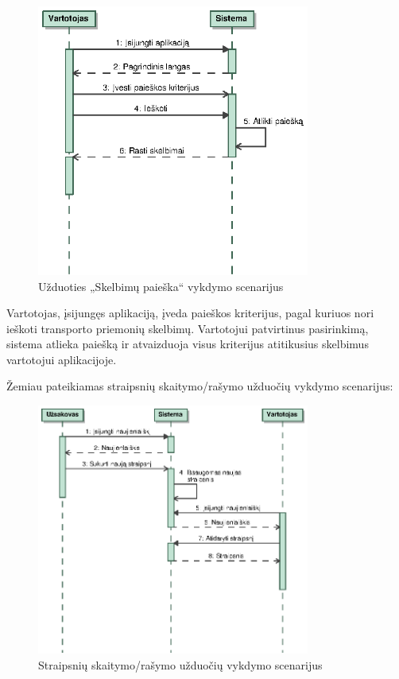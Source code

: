 \documentclass[12pt]{article}
\begin{document}
	\begin{figure}[h]
		\begin{center}
			\includegraphics[width=0.8\textwidth]{PaieskaSeka.eps}
			\caption{Užduoties „Skelbimų paieška“ vykdymo scenarijus\label{SearchScenario}}
		\end{center}
	\end{figure}
	
	Vartotojas, įsijungęs aplikaciją, įveda paieškos kriterijus, pagal kuriuos nori ieškoti transporto priemonių skelbimų. Vartotojui patvirtinus pasirinkimą, sistema atlieka paiešką ir atvaizduoja visus kriterijus atitikusius skelbimus vartotojui aplikacijoje.
	\pagebreak
	
	Žemiau pateikiamas straipsnių skaitymo/rašymo užduočių vykdymo scenarijus:
	
	\begin{figure}[h]
		\begin{center}
			\includegraphics[width=0.8\textwidth]{Straipsniai.eps}
			\caption{Straipsnių skaitymo/rašymo užduočių vykdymo scenarijus\label{ArticleScenario}}
		\end{center}
	\end{figure}
	
\end{document}
